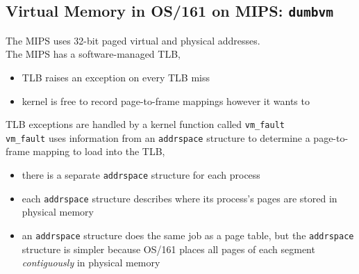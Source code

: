 \documentclass[12pt]{article}
\theoremstyle{plain}
\theoremstyle{definition}
\begin{document}
\subsection{Virtual Memory in OS/161 on MIPS: \texttt{dumbvm}}
The MIPS uses 32-bit paged virtual and physical addresses. \\
The MIPS has a software-managed TLB,
\begin{itemize}
  \item TLB raises an exception on every TLB miss
  \item kernel is free to record page-to-frame mappings however it wants to
\end{itemize}

TLB exceptions are handled by a kernel function called \texttt{vm\_fault} \\
\texttt{vm\_fault} uses information from an \texttt{addrspace} structure to determine a page-to-frame mapping to load into the TLB,
\begin{itemize}
  \item there is a separate \texttt{addrspace} structure for each process
  \item each \texttt{addrspace} structure describes where its process's pages are stored in physical memory
  \item an \texttt{addrspace} structure does the same job as a page table, but the \texttt{addrspace} structure is simpler because OS/161 places all pages of each segment \emph{contiguously} in physical memory
\end{itemize}
\end{document}
